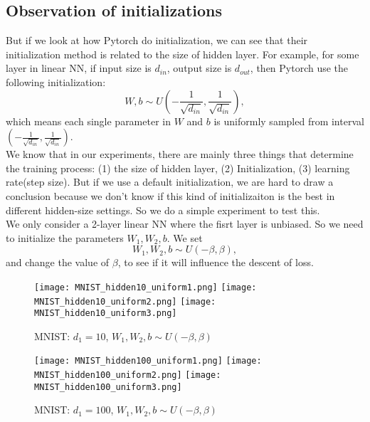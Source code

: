 \subsection{Observation of initializations}

But if we look at how Pytorch do initialization, we can see that their initialization method is related to the size of hidden layer. For example, for some layer in linear NN, if input size is $d_{in}$, output size is $d_{out}$, then Pytorch use the following initialization:
\begin{equation}
	W,b \sim U(-\frac{1}{\sqrt{d_{in}}},\frac{1}{\sqrt{d_{in}}}),
\end{equation}
 which means each single parameter in $W$ and $b$ is uniformly sampled from interval $(-\frac{1}{\sqrt{d_{in}}},\frac{1}{\sqrt{d_{in}}})$.\\
 
 We know that in our experiments, there are mainly three things that determine the training process: (1) the size of hidden layer, (2) Initialization, (3) learning rate(step size). But if we use a default initialization, we are hard to draw a conclusion because we don't know if this kind of initializaiton is the best in different hidden-size settings. So we do a simple experiment to test this. \\
 \indent We only consider a 2-layer linear NN where the fisrt layer is unbiased. So we need to initialize the parameters $W_1,W_2,b$. We set
 \begin{equation}
 	W_1,W_2,b \sim U(-\beta,\beta),
 \end{equation}
 and change the value of $\beta$, to see if it will influence the descent of loss.
 
  \begin{figure}[H]
 	\centering
 	\texttt{[image: MNIST\_hidden10\_uniform1.png]}
 	\texttt{[image: MNIST\_hidden10\_uniform2.png]}
 	\texttt{[image: MNIST\_hidden10\_uniform3.png]}
 	\caption{MNIST: $d_1 = 10$, $W_1,W_2,b \sim U(-\beta,\beta)$}
 \end{figure}

 \begin{figure}[H]
 	\centering
 	\texttt{[image: MNIST\_hidden100\_uniform1.png]}
 	\texttt{[image: MNIST\_hidden100\_uniform2.png]}
 	\texttt{[image: MNIST\_hidden100\_uniform3.png]}
 	\caption{MNIST: $d_1 = 100$, $W_1,W_2,b \sim U(-\beta,\beta)$}
 \end{figure}

